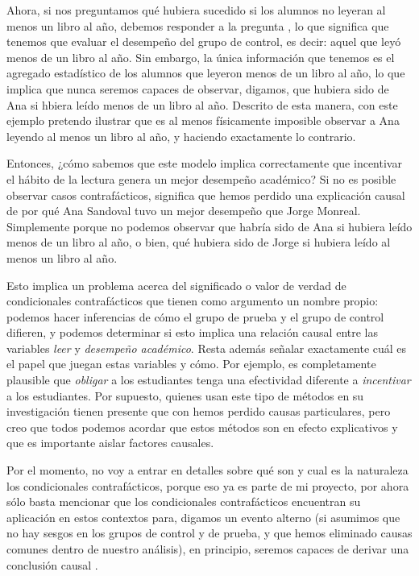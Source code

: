 Ahora, si nos preguntamos qué hubiera sucedido si los alumnos no
leyeran al menos un libro al año, debemos responder a la pregunta
, lo que significa que tenemos que
evaluar el desempeño del grupo de control, es decir: aquel que leyó
menos de un libro al año. Sin embargo, la única información que
tenemos es el agregado estadístico de los alumnos que leyeron menos
de un libro al año, lo que implica que nunca seremos capaces de
observar, digamos, que hubiera sido de Ana si hbiera leído menos de
un libro al año. Descrito de esta manera, con este ejemplo pretendo
ilustrar que es al menos físicamente imposible observar a Ana leyendo
al menos un libro al año, y haciendo exactamente lo contrario.

Entonces, ¿cómo sabemos que este modelo implica correctamente que
incentivar el hábito de la lectura genera un mejor desempeño
académico? Si no es posible observar casos contrafácticos, significa
que hemos perdido una explicación causal de por qué Ana Sandoval tuvo
un mejor desempeño que Jorge Monreal. Simplemente porque no podemos
observar que habría sido de Ana si hubiera leído menos de un libro al
año, o bien, qué hubiera sido de Jorge si hubiera leído al menos un
libro al año.

Esto implica un problema acerca del significado o valor de verdad de
condicionales contrafácticos que tienen como argumento un nombre
propio: podemos hacer inferencias de cómo el grupo de prueba y el
grupo de control difieren, y podemos determinar si esto implica una
relación causal entre las variables \emph{leer} y \emph{desempeño
 académico}. Resta además señalar exactamente cuál es el papel que
juegan estas variables y cómo. Por ejemplo, es completamente
plausible que \emph{obligar} a los estudiantes tenga una efectividad
diferente a \emph{incentivar} a los estudiantes. Por supuesto,
quienes usan este tipo de métodos en su investigación tienen presente
que con hemos perdido causas particulares, pero creo que todos
podemos acordar que estos métodos son en efecto explicativos y que es
importante aislar factores causales.

Por el momento, no voy a entrar en detalles sobre qué son y cual es
la naturaleza los condicionales contrafácticos, porque eso ya es
parte de mi proyecto, por ahora sólo basta mencionar que los
condicionales contrafácticos encuentran su aplicación en estos
contextos para, digamos  un evento alterno (si asumimos
que no hay sesgos en los grupos de control y de prueba, y que hemos
eliminado causas comunes dentro de nuestro análisis), en principio,
seremos capaces de derivar una conclusión causal \cite{Pearl2016,
 Otsuka2023}.

